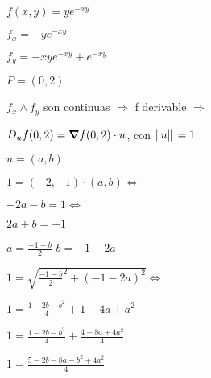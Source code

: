 \documentclass[../practica_04.tex]{subfiles}
\begin{document}
    $ f(x,y) = ye^{-xy} $

    $ f_x = -ye^{-xy} $

    $ f_y = -xye^{-xy} + e^{-xy} $

    $ P = (0,2) $

    $f_x \wedge f_y $ son continuas $\Rightarrow$ f derivable $\Rightarrow$

    $ D_u f(0,2) = \grad f(0,2) \cdot u $, con $\norm*{u} = 1$

    $ u = (a,b) $

    $ 1 = (-2, -1) \cdot (a,b ) \Leftrightarrow$

    $ -2a -b = 1 \Leftrightarrow $

    $ 2a + b = -1 $

    $ a = \frac{-1-b}{2} $
    $ b = -1 - 2a $

    $ 1 = \sqrt{\frac{-1-b}{2}^2 + (-1-2a)^2} \Leftrightarrow$

    $ 1 = \frac{1-2b-b^2}{4} + 1-4a+a^2 $

    $ 1 = \frac{1-2b-b^2}{4} + \frac{4-8a+4a^2}{4} $

    $ 1 = \frac{5-2b-8a-b^2+4a^2}{4}$
\end{document}
